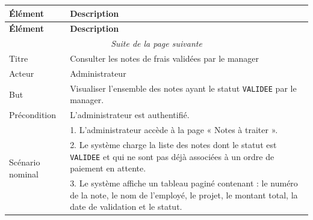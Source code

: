 \documentclass[12pt,a4paper]{report}
\begin{document}

\label{tab:view_validated_notes_desc}

\begin{longtable}{|p{3.5cm}|p{11cm}|}

\hline

\textbf{Élément} & \textbf{Description} \\

\hline

\endfirsthead

\hline

\textbf{Élément} & \textbf{Description} \\

\hline

\endhead

\hline

\multicolumn{2}{|c|}{\textit{Suite de la page suivante}} \\

\hline

\endfoot

\hline

\endlastfoot

Titre & Consulter les notes de frais validées par le manager \\

\hline

Acteur & Administrateur \\

\hline

But & Visualiser l'ensemble des notes ayant le statut \texttt{VALIDEE} par le manager.\\

\hline

Précondition & L'administrateur est authentifié. \\

\hline

\multirow{5}{*}{Scénario nominal} & 1. L'administrateur accède à la page « Notes à traiter ». \\

& 2. Le système charge la liste des notes dont le statut est \texttt{VALIDEE} et qui ne sont pas déjà associées à un ordre de paiement en attente. \\

& 3. Le système affiche un tableau paginé contenant : le numéro de la note, le nom de l'employé, le projet, le montant total, la date de validation et le statut. \\


\end{longtable}
\end{document}
